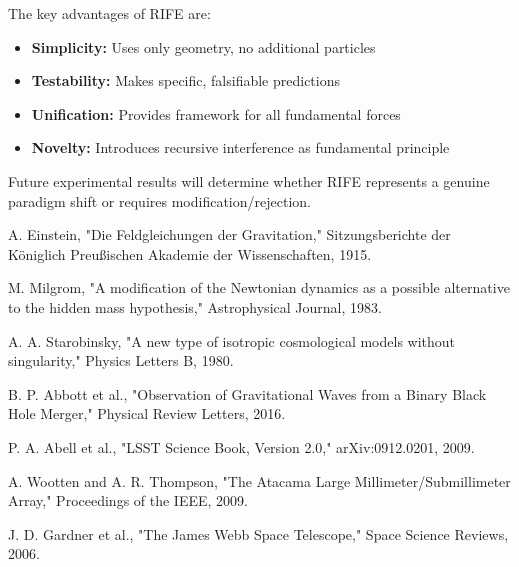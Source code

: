 \documentclass[11pt]{article}
\begin{document}
The key advantages of RIFE are:
\begin{itemize}
\item \textbf{Simplicity:} Uses only geometry, no additional particles
\item \textbf{Testability:} Makes specific, falsifiable predictions
\item \textbf{Unification:} Provides framework for all fundamental forces
\item \textbf{Novelty:} Introduces recursive interference as fundamental principle
\end{itemize}

Future experimental results will determine whether RIFE represents a genuine paradigm shift or requires modification/rejection.

\begin{thebibliography}{99}

A. Einstein, "Die Feldgleichungen der Gravitation," Sitzungsberichte der Königlich Preußischen Akademie der Wissenschaften, 1915.

M. Milgrom, "A modification of the Newtonian dynamics as a possible alternative to the hidden mass hypothesis," Astrophysical Journal, 1983.

A. A. Starobinsky, "A new type of isotropic cosmological models without singularity," Physics Letters B, 1980.

B. P. Abbott et al., "Observation of Gravitational Waves from a Binary Black Hole Merger," Physical Review Letters, 2016.

P. A. Abell et al., "LSST Science Book, Version 2.0," arXiv:0912.0201, 2009.

A. Wootten and A. R. Thompson, "The Atacama Large Millimeter/Submillimeter Array," Proceedings of the IEEE, 2009.

J. D. Gardner et al., "The James Webb Space Telescope," Space Science Reviews, 2006.

\end{thebibliography}

\end{document}
